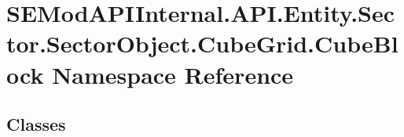 \hypertarget{namespace_s_e_mod_a_p_i_internal_1_1_a_p_i_1_1_entity_1_1_sector_1_1_sector_object_1_1_cube_grid_1_1_cube_block}{}\section{S\+E\+Mod\+A\+P\+I\+Internal.\+A\+P\+I.\+Entity.\+Sector.\+Sector\+Object.\+Cube\+Grid.\+Cube\+Block Namespace Reference}
\label{namespace_s_e_mod_a_p_i_internal_1_1_a_p_i_1_1_entity_1_1_sector_1_1_sector_object_1_1_cube_grid_1_1_cube_block}
\subsection*{Classes}
